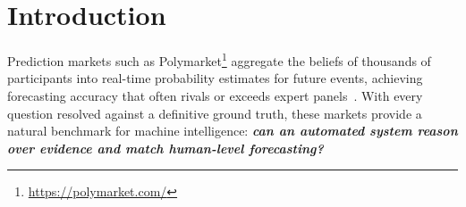 \documentclass[11pt]{article}
\theoremstyle{plain}
\theoremstyle{definition}
\begin{document}

\section{Introduction}
\label{sec:intro}

Prediction markets such as Polymarket\footnote{\url{https://polymarket.com/}} aggregate the beliefs of thousands of participants into real-time probability estimates for future events, achieving forecasting
accuracy that often rivals or exceeds expert panels~\citep{tetlock2005expert}. With every question resolved against a definitive ground truth, these markets provide a natural benchmark for machine intelligence: \textit{\textbf{can an automated system reason over evidence and match human-level forecasting?}}
\end{document}
